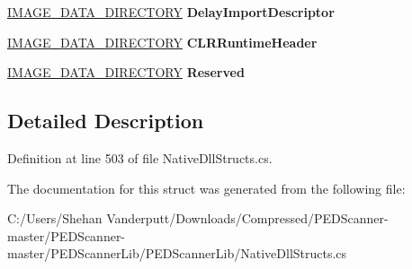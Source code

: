 \begin{DoxyCompactItemize}
\mbox{\hyperlink{struct_p_e_d_scanner_lib_1_1_struct_1_1_pe_header_reader_1_1_i_m_a_g_e___d_a_t_a___d_i_r_e_c_t_o_r_y}{I\+M\+A\+G\+E\+\_\+\+D\+A\+T\+A\+\_\+\+D\+I\+R\+E\+C\+T\+O\+RY}} {\bfseries Delay\+Import\+Descriptor}
\item 
\mbox{\label{struct_p_e_d_scanner_lib_1_1_struct_1_1_pe_header_reader_1_1_i_m_a_g_e___o_p_t_i_o_n_a_l___h_e_a_d_e_r64_a80e74611692b3c2855acc1a4176099fa}} 
\mbox{\hyperlink{struct_p_e_d_scanner_lib_1_1_struct_1_1_pe_header_reader_1_1_i_m_a_g_e___d_a_t_a___d_i_r_e_c_t_o_r_y}{I\+M\+A\+G\+E\+\_\+\+D\+A\+T\+A\+\_\+\+D\+I\+R\+E\+C\+T\+O\+RY}} {\bfseries C\+L\+R\+Runtime\+Header}
\item 
\mbox{\label{struct_p_e_d_scanner_lib_1_1_struct_1_1_pe_header_reader_1_1_i_m_a_g_e___o_p_t_i_o_n_a_l___h_e_a_d_e_r64_a8d460a329b4168e60122b2b02f8f19c6}} 
\mbox{\hyperlink{struct_p_e_d_scanner_lib_1_1_struct_1_1_pe_header_reader_1_1_i_m_a_g_e___d_a_t_a___d_i_r_e_c_t_o_r_y}{I\+M\+A\+G\+E\+\_\+\+D\+A\+T\+A\+\_\+\+D\+I\+R\+E\+C\+T\+O\+RY}} {\bfseries Reserved}
\end{DoxyCompactItemize}


\subsection{Detailed Description}


Definition at line 503 of file Native\+Dll\+Structs.\+cs.



The documentation for this struct was generated from the following file\+:\begin{DoxyCompactItemize}
\item 
C\+:/\+Users/\+Shehan Vanderputt/\+Downloads/\+Compressed/\+P\+E\+D\+Scanner-\/master/\+P\+E\+D\+Scanner-\/master/\+P\+E\+D\+Scanner\+Lib/\+P\+E\+D\+Scanner\+Lib/Native\+Dll\+Structs.\+cs\end{DoxyCompactItemize}
